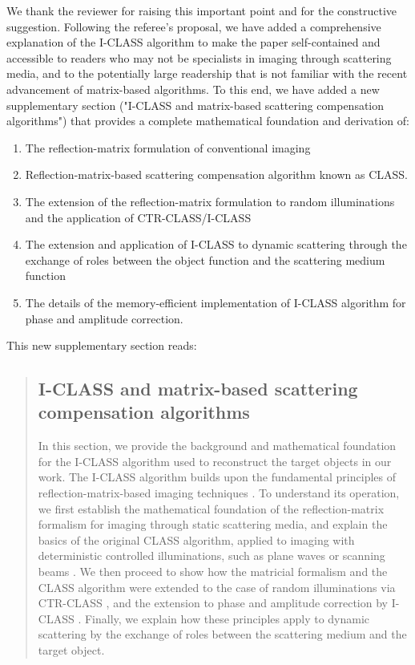 \documentclass[12pt]{article}
\newenvironment{ourresponse}
    {\begin{tcolorbox}[width=\linewidth,breakable,enhanced,colback=gray!5,colframe=responsecolor!50,title=Response,left=5pt,right=5pt]}
    {\end{tcolorbox}}
\begin{document}
\begin{ourresponse}
We thank the reviewer for raising this important point and for the constructive suggestion. Following the referee's proposal, we have added a comprehensive explanation of the I-CLASS algorithm to make the paper self-contained and accessible to readers who may not be specialists in imaging through scattering media, and to the potentially large readership that is not familiar with the recent advancement of matrix-based algorithms.
To this end, we have added a new supplementary section ("I-CLASS and matrix-based scattering compensation algorithms") that provides a complete mathematical foundation and derivation of:

\begin{enumerate}
    \item The reflection-matrix formulation of conventional imaging
    \item Reflection-matrix-based scattering compensation algorithm known as CLASS.
    \item The extension of the reflection-matrix formulation to random illuminations and the application of CTR-CLASS/I-CLASS
    \item The extension and application of I-CLASS to dynamic scattering through the exchange of roles between the object function and the scattering medium function
    \item The details of the memory-efficient implementation of I-CLASS algorithm for phase and amplitude correction.
\end{enumerate}

This new supplementary section reads:

\begin{quote}
    \subsection*{I-CLASS and matrix-based scattering compensation algorithms}

In this section, we provide the background and mathematical foundation for the I-CLASS algorithm used to reconstruct the target objects in our work. 
The I-CLASS algorithm builds upon the fundamental principles of reflection-matrix-based imaging techniques \cite{lee22}. To understand its operation, we first establish the mathematical foundation of the reflection-matrix formalism for imaging through static scattering media, and explain the basics of the original CLASS algorithm, applied to imaging with deterministic controlled illuminations, such as plane waves or scanning beams \cite{yoon2020laser}. 
We then proceed to show how the matricial formalism and the CLASS algorithm were extended to the case of random illuminations via CTR-CLASS \cite{lee22}, and the extension to phase and amplitude correction by I-CLASS \cite{weinberg2024noninvasive}. Finally, we explain how these principles apply to dynamic scattering by the exchange of roles between the scattering medium and the target object.


\end{quote}
\end{ourresponse}
\end{document}
